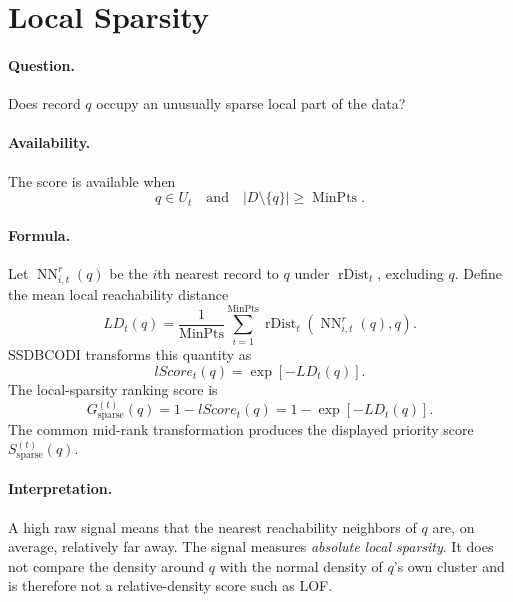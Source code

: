 \documentclass[11pt]{article}
\newcommand{\rDist}{\operatorname{rDist}}
\newcommand{\MinPts}{\operatorname{MinPts}}
\begin{document}
\section{Local Sparsity}

\paragraph{Question.}
Does record $q$ occupy an unusually sparse local part of the data?

\paragraph{Availability.}
The score is available when
\begin{equation}
    q\in U_t
    \quad\text{and}\quad
    |D\setminus\{q\}|\geq\MinPts.
\end{equation}

\paragraph{Formula.}
Let $\operatorname{NN}^{r}_{i,t}(q)$ be the $i$th nearest record to $q$ under
$\rDist_t$, excluding $q$. Define the mean local reachability distance
\begin{equation}
    LD_t(q)
    =
    \frac{1}{\MinPts}
    \sum_{i=1}^{\MinPts}
    \rDist_t\!\left(\operatorname{NN}^{r}_{i,t}(q),q\right).
\end{equation}
SSDBCODI transforms this quantity as
\begin{equation}
    lScore_t(q)=\exp[-LD_t(q)].
\end{equation}
The local-sparsity ranking score is
\begin{equation}
    \boxed{
    G_{\mathrm{sparse}}^{(t)}(q)
    =
    1-lScore_t(q)
    =
    1-\exp[-LD_t(q)]
    }.
\end{equation}
The common mid-rank transformation produces the displayed priority score
$S_{\mathrm{sparse}}^{(t)}(q)$.

\paragraph{Interpretation.}
A high raw signal means that the nearest reachability neighbors of $q$ are, on
average, relatively far away. The signal measures \emph{absolute local sparsity}.
It does not compare the density around $q$ with the normal density of $q$'s own
cluster and is therefore not a relative-density score such as LOF.
\end{document}

